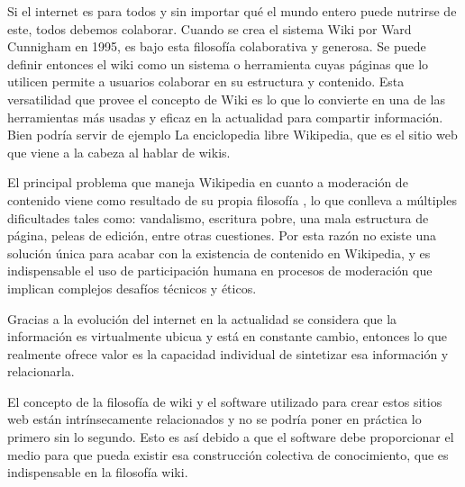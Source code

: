 

Si el internet es para todos y sin importar qué el mundo entero puede nutrirse de este, todos debemos colaborar. Cuando se crea el sistema Wiki por Ward Cunnigham en 1995, es bajo esta filosofía colaborativa y generosa. Se puede definir entonces el wiki como un sistema o herramienta cuyas páginas que lo utilicen permite a usuarios colaborar en su estructura y contenido. Esta versatilidad que provee el concepto de Wiki es lo que lo convierte en una de las herramientas más usadas y eficaz en la actualidad para compartir información. Bien podría servir de ejemplo La enciclopedia libre Wikipedia, que es el sitio web que viene a la cabeza al hablar de wikis.

El principal problema que maneja Wikipedia en cuanto a moderación de contenido viene como resultado de su propia filosofía , lo que conlleva a múltiples dificultades tales como: vandalismo, escritura pobre, una mala estructura de página, peleas de edición, entre otras cuestiones. Por esta razón no existe una solución única para acabar con la existencia de  contenido en Wikipedia, y es indispensable el uso de participación humana en procesos de moderación que implican complejos desafíos técnicos y éticos.

Gracias a la evolución del internet en la actualidad se considera que la información es virtualmente ubicua y está en constante cambio, entonces lo que realmente ofrece valor es la capacidad individual de sintetizar esa información y relacionarla.

El concepto de la filosofía de wiki y el software utilizado para crear estos sitios web están intrínsecamente relacionados y no se podría poner en práctica lo primero sin lo segundo. Esto es así debido a que el software debe proporcionar el medio para que pueda existir esa construcción colectiva de conocimiento, que es indispensable en la filosofía wiki.



